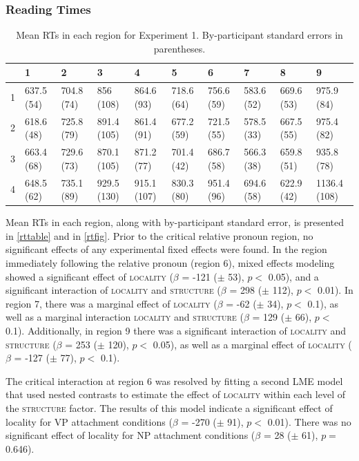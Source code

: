\documentclass[12pt]{article}
\begin{document}
\subsubsection{Reading Times}
\label{sec:rts}

\begin{table}[ht]
\centering
{\scriptsize
\begin{tabularx}{\textwidth}{rlllllllll}
  \hline
 & 1 & 2 & 3 & 4 & 5 & 6 & 7 & 8 & 9 \\ 
  \hline
1 & 637.5 (54) & 704.8 (74) & 856 (108) & 864.6 (93) & 718.6 (64) & 756.6 (59) & 583.6 (52) & 669.6 (53) & 975.9 (84) \\ 
  2 & 618.6 (48) & 725.8 (79) & 891.4 (105) & 861.4 (91) & 677.2 (59) & 721.5 (55) & 578.5 (33) & 667.5 (55) & 975.4 (82) \\ 
  3 & 663.4 (68) & 729.6 (73) & 870.1 (105) & 871.2 (77) & 701.4 (42) & 686.7 (58) & 566.3 (38) & 659.8 (51) & 935.8 (78) \\ 
  4 & 648.5 (62) & 735.1 (89) & 929.5 (130) & 915.1 (107) & 830.3 (80) & 951.4 (96) & 694.6 (58) & 622.9 (42) & 1136.4 (108) \\ 
   \hline
\end{tabularx}
}
\caption{Mean RTs in each region for Experiment 1. By-participant standard errors in parentheses.} 
\end{table}
Mean RTs in each region, along with by-participant standard error, is presented in \ref{rttable} and in \ref{rtfig}. Prior to the critical relative pronoun region, no significant effects of any experimental fixed effects were found. In the region immediately following the relative pronoun (region 6), mixed effects modeling showed a significant effect of \textsc{locality} ($\beta$ = -121 ($\pm$ 53), $p <$ 0.05), and a significant interaction of \textsc{locality} and \textsc{structure} ($\beta$ = 298 ($\pm$ 112), $p <$ 0.01). In region 7, there was a marginal effect of \textsc{locality} ($\beta$ = -62 ($\pm$ 34), $p <$ 0.1), as well as a marginal interaction \textsc{locality} and \textsc{structure} ($\beta$ = 129 ($\pm$ 66), $p <$ 0.1). Additionally, in region 9 there was a significant interaction of \textsc{locality} and \textsc{structure} ($\beta$ = 253 ($\pm$ 120), $p <$ 0.05), as well as a marginal effect of \textsc{locality} ($\beta$ = -127 ($\pm$ 77), $p <$ 0.1).

The critical interaction at region 6 was resolved by fitting a second LME model that used nested contrasts to estimate the effect of \textsc{locality} within each level of the \textsc{structure} factor. The results of this model indicate a significant effect of locality for VP attachment conditions ($\beta$ = -270 ($\pm$ 91), $p <$ 0.01). There was no significant effect of locality for NP attachment conditions ($\beta$ = 28 ($\pm$ 61), $p =$ 0.646).
\end{document}
